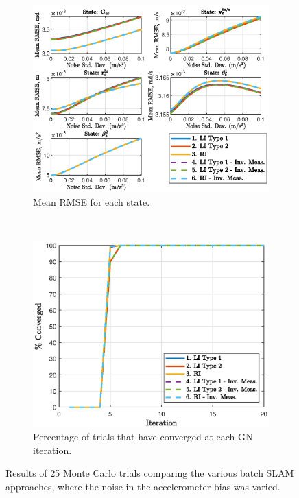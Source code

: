 \begin{figure}
	\centering
	\begin{subfigure}[b]{0.5\textwidth}
		\includegraphics[width=\textwidth]{figs/batch/accel_bias_rmse.eps}
		\caption{Mean RMSE for each state.}
	\end{subfigure}
	~
	\begin{subfigure}[b]{0.5\textwidth}
		\includegraphics[width=\textwidth]{figs/batch/accel_bias_perc.eps}
		\caption{Percentage of trials that have converged at each GN iteration.}
	\end{subfigure}
	\caption[Results comparing batch SLAM approaches vvarying accelerometer bias noise.]{Results of 25 Monte Carlo trials comparing the various batch SLAM approaches, where the noise in the accelerometer bias was varied.}
	\label{fig:batch_accel_bias}
\end{figure} 

